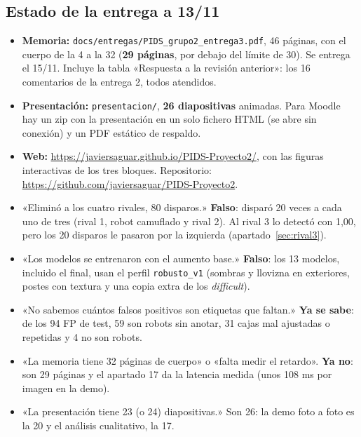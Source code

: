 \documentclass[11pt,a4paper]{article}
\newcommand{\cod}[1]{\texttt{#1}}
\begin{document}
\subsection*{Estado de la entrega a 13/11}
\begin{itemize}
  \item \textbf{Memoria:} \cod{docs/\allowbreak{}entregas/\allowbreak{}PIDS\_\allowbreak{}grupo2\_\allowbreak{}entrega3.pdf}, 46 páginas, con el cuerpo de la 4 a la 32 (\textbf{29 páginas}, por debajo del límite de 30). Se entrega el 15/11. Incluye la tabla «Respuesta a la revisión anterior»: los 16 comentarios de la entrega 2, todos atendidos.
  \item \textbf{Presentación:} \cod{presentacion/}, \textbf{26 diapositivas} animadas. Para Moodle hay un zip con la presentación en un solo fichero HTML (se abre sin conexión) y un PDF estático de respaldo.
  \item \textbf{Web:} \url{https://javiersaguar.github.io/PIDS-Proyecto2/}, con las figuras interactivas de los tres bloques. Repositorio: \url{https://github.com/javiersaguar/PIDS-Proyecto2}.
\end{itemize}

\begin{cuidado}
\begin{itemize}[leftmargin=*]
  \item «Eliminó a los cuatro rivales, 80 disparos.» \textbf{Falso}: disparó 20 veces a cada uno de tres (rival 1, robot camuflado y rival 2). Al rival 3 lo detectó con 1,00, pero los 20 disparos le pasaron por la izquierda (apartado~\ref{sec:rival3}).
  \item «Los modelos se entrenaron con el aumento base.» \textbf{Falso}: los 13 modelos, incluido el final, usan el perfil \cod{robusto\_\allowbreak{}v1} (sombras y llovizna en exteriores, postes con textura y una copia extra de los \emph{difficult}).
  \item «No sabemos cuántos falsos positivos son etiquetas que faltan.» \textbf{Ya se sabe}: de los 94 FP de test, 59 son robots sin anotar, 31 cajas mal ajustadas o repetidas y 4 no son robots.
  \item «La memoria tiene 32 páginas de cuerpo» o «falta medir el retardo». \textbf{Ya no}: son 29 páginas y el apartado 17 da la latencia medida (unos 108 ms por imagen en la demo).
  \item «La presentación tiene 23 (o 24) diapositivas.» Son 26: la demo foto a foto es la 20 y el análisis cualitativo, la 17.
\end{itemize}
\end{cuidado}
\end{document}
